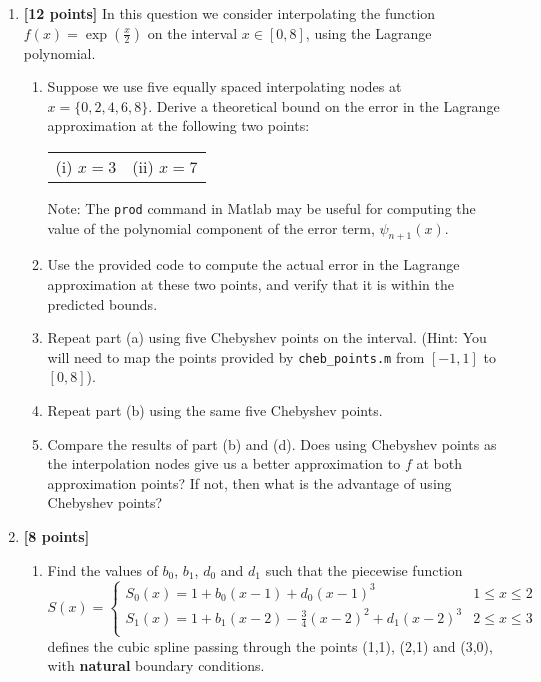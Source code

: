 \documentclass{article}
\begin{document}
\begin{enumerate}
\item {\bf [12 points]} In this question we consider interpolating the function $\displaystyle f(x) = \exp \left(\frac{x}{2}\right)$ on the interval $x \in [0,8]$, using the Lagrange polynomial.
\begin{enumerate}
\item Suppose we use five equally spaced interpolating nodes at $x = \{0,2,4,6,8\}$.  Derive a theoretical bound on the error in the Lagrange approximation at the following two points:

\begin{tabular}{rr}
(i) $x = 3$	&(ii) $x=7$
\end{tabular}

Note: The {\tt prod} command in Matlab may be useful for computing the value of the polynomial component of the error term, $\psi_{n+1}(x)$.
\item Use the provided code to compute the actual error in the Lagrange approximation at these two points, and verify that it is within the predicted bounds.
\item Repeat part (a) using five Chebyshev points on the interval. (Hint: You will need to map the points provided by {\tt cheb\_points.m} from $[-1,1]$ to $[0,8]$).
\item Repeat part (b) using the same five Chebyshev points.
\item Compare the results of part (b) and (d). Does using Chebyshev points as the interpolation nodes give us a better approximation to $f$ at both approximation points? If not, then what is the advantage of using Chebyshev points?
\end{enumerate}
\medskip

\item  {\bf [8 points]} 
\begin{enumerate}
\item Find the values of $b_0$, $b_1$, $d_0$ and $d_1$ such that the piecewise function
\begin{equation*}
S(x) = \begin{cases}
S_0(x) = 1 + b_0(x-1) + d_0(x-1)^3					&1 \leq x \leq 2 \\
S_1(x) = 1 + b_1(x-2) - \frac{3}{4}(x-2)^2 + d_1(x-2)^3 		&2 \leq x \leq 3 \\
\end{cases}
\end{equation*}
defines the cubic spline passing through the points (1,1), (2,1) and (3,0), with {\bf natural} boundary conditions.


\end{enumerate}
\end{enumerate}
\end{document}
